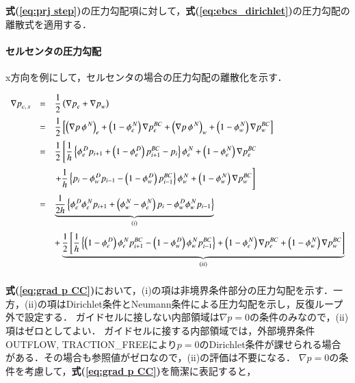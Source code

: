 \textbf{式(\ref{eq:prj step})}の圧力勾配項に対して，\textbf{式(\ref{eq:ebcs_dirichlet})}の圧力勾配の離散式を適用する．

%
\paragraph{セルセンタの圧力勾配}
x方向を例にして，セルセンタの場合の圧力勾配の離散化を示す．

\begin{equation}
\begin{array}{lll}
{\nabla p}_{c,\,x} &=& \displaystyle{ \frac{1}{2} \left( {\nabla p}_e + {\nabla p}_w \right) } \vspace{2mm}\\
 &=& \displaystyle{ \frac{1}{2} \left[
 {\left( \nabla p\,\phi^{\,N} \right)}_e + \left( 1-\phi^{\,N}_e \right) \nabla p^{BC}_e
+{\left( \nabla p\,\phi^{\,N} \right)}_w + \left( 1-\phi^{\,N}_w \right) \nabla p^{BC}_w
 \right] } \vspace{2mm}\\
 &=& \displaystyle{ \frac{1}{2} \left[ \frac{1}{h} \left\{ \phi^{\,D}_e p_{i+1} + \left( 1-\phi^{\,D}_e \right) p^{BC}_{i+1} -p_i \right\} \phi^{\,N}_e + \left( 1-\phi^{\,N}_e \right) \nabla p^{BC}_e \right.} \vspace{2mm}\\
 & & \displaystyle{ \left. + \frac{1}{h} \left\{ p_i - \phi^{\,D}_w p_{i-1} - \left( 1-\phi^{\,D}_w \right) p^{BC}_{i-1} \right\} \phi^{\,N}_w + \left( 1-\phi^{\,N}_w \right) \nabla p^{BC}_w \right]} \vspace{2mm}\\
 &=& \displaystyle{ \underbrace{ \frac{1}{2h} \left\{ \phi^{\,D}_e \phi^{\,N}_e p_{i+1} + \left( \phi^{\,N}_w - \phi^{\,N}_e \right) p_i - \phi^{\,D}_w \phi^{\,N}_w p_{i-1} \right\} }_{(i)} } \vspace{2mm}\\
 & & \displaystyle{ + \underbrace{ \frac{1}{2} \left[
 \frac{1}{h} \left\{ \left( 1-\phi^{\,D}_e \right) \phi^{\,N}_e p^{BC}_{i+1} 
 - \left( 1-\phi^{\,D}_w \right) \phi^{\,N}_w p^{BC}_{i-1} \right\} 
 + \left( 1-\phi^{\,N}_e \right) \nabla p^{BC}_e + \left( 1-\phi^{\,N}_w \right) \nabla p^{BC}_w
 \right] }_{(ii)} } \vspace{2mm}\\
\end{array}
\label{eq:grad p CC}
\end{equation}

\textbf{式(\ref{eq:grad p CC})}において，(i)の項は非境界条件部分の圧力勾配を示す．一方，(ii)の項はDirichlet条件とNeumann条件による圧力勾配を示し，反復ループ外で設定する．
ガイドセルに接しない内部領域は$\nabla p=0$の条件のみなので，(ii)項はゼロとしてよい．
ガイドセルに接する内部領域では，外部境界条件OUTFLOW, TRACTION\_FREEにより$p=0$のDirichlet条件が課せられる場合がある．その場合も参照値がゼロなので，(ii)の評価は不要になる．
$\nabla p=0$の条件を考慮して，\textbf{式(\ref{eq:grad p CC})}を簡潔に表記すると，

